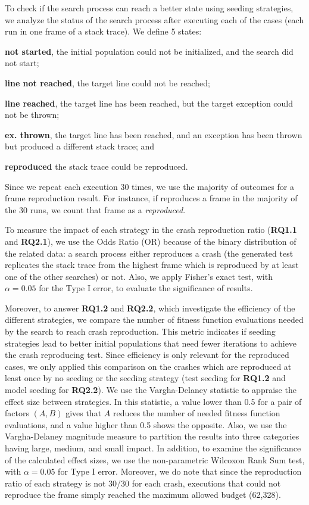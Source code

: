 To check if the search process can reach a better state using seeding strategies, we analyze the status of the search process after executing each of the cases (each run in one frame of a stack trace). We define 5 states: %
% 
\begin{compactenum}[(i)]
\item \textbf{not started}, the initial population could not be initialized, and the search did not start;
\item \textbf{line not reached}, the target line could not be reached;
\item \textbf{line reached}, the target line has been reached, but the target exception could not be thrown;
\item \textbf{ex. thrown}, the target line has been reached, and an exception has been thrown but produced a different stack trace; and 
\item \textbf{reproduced} the stack trace could be reproduced.
\end{compactenum}
%
Since we repeat each execution 30 times, we use the majority of outcomes for a frame reproduction result. For instance, if \botsing reproduces a frame in the majority of the 30 runs, we count that frame as a \textit{reproduced}. 


To measure the impact of each strategy in the crash reproduction ratio (\textbf{RQ1.1} and \textbf{RQ2.1}), we use the Odds Ratio (OR) because of the binary distribution of the related data:  a search process either reproduces a crash (the generated test replicates the stack trace from the highest frame which is reproduced by at least one of the other searches) or not. Also, we apply Fisher's exact test, with $\alpha = 0.05$ for the Type I error, to evaluate the significance of results.

Moreover, to answer \textbf{RQ1.2} and \textbf{RQ2.2}, which investigate the efficiency of the different strategies, we compare the number of fitness function evaluations needed by the search to reach crash reproduction.
This metric indicates if seeding strategies lead to better initial populations that need fewer iterations to achieve the crash reproducing test. Since efficiency is only relevant for the reproduced cases, we only applied this comparison on the crashes which are reproduced at least once by no seeding or the seeding strategy (test seeding for \textbf{RQ1.2} and model seeding for \textbf{RQ2.2}).
 We use the Vargha-Delaney statistic \cite{vargha} to appraise the effect size between strategies. In this statistic, a value lower than 0.5 for a pair of factors $(A,B)$ gives that $A$ reduces the number of needed fitness function evaluations, and a value higher than 0.5 shows the opposite. Also, we use the Vargha-Delaney magnitude measure to partition the results into three categories having large, medium, and small impact. In addition, to examine the significance of the calculated effect sizes, we use the non-parametric Wilcoxon Rank Sum test, with  $\alpha = 0.05$  for Type I error. Moreover, we do note that since the reproduction ratio of each strategy is not 30/30 for each crash, executions that could not reproduce the frame simply reached the maximum allowed budget (62,328).


